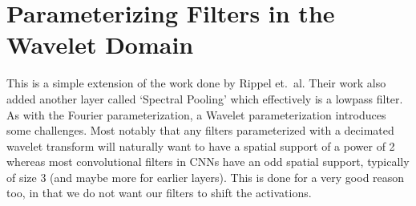 \section{Parameterizing Filters in the Wavelet Domain}
This is a simple extension of the work done by Rippel et.\ al. Their work also
added another layer called `Spectral Pooling' which effectively is a lowpass
filter. As with the Fourier parameterization, a Wavelet parameterization
introduces some challenges. Most notably that any filters parameterized with a
decimated wavelet transform will naturally want to have a spatial support of a
power of 2 whereas most convolutional filters in CNNs have an odd spatial
support, typically of size 3 (and maybe more for earlier layers). This is done
for a very good reason too, in that we do not want our filters to shift the
activations. 
